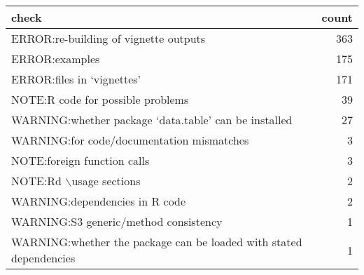 \begin{tabular}{lr}
  \hline
check & count \\ 
  \hline
ERROR:re-building of vignette outputs & 363 \\ 
  ERROR:examples & 175 \\ 
  ERROR:files in ‘vignettes’ & 171 \\ 
  NOTE:R code for possible problems & 39 \\ 
  WARNING:whether package ‘data.table’ can be installed & 27 \\ 
  WARNING:for code/documentation mismatches &  3 \\ 
  NOTE:foreign function calls &  3 \\ 
  NOTE:Rd $\backslash$usage sections &  2 \\ 
  WARNING:dependencies in R code &  2 \\ 
  WARNING:S3 generic/method consistency &  1 \\ 
  WARNING:whether the package can be loaded with stated dependencies &  1 \\ 
   \hline
\end{tabular}
